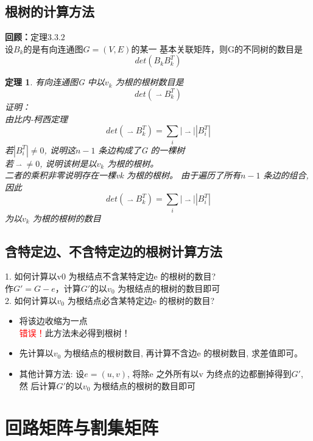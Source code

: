 \documentclass[11pt,a4paper,openany]{book}
\newcommand{\song}{\CJKfamily{song}}
\newtheorem{theorem}{\textbf{定理}}[section]
\begin{document}
\subsection{根树的计算方法}
\textbf{回顾：}定理$3.3.2$\\
设$B_k$的是有向连通图$G=(V,E)$的某一
基本关联矩阵，则G的不同树的数目是$$det(B_kB^T_k)$$
\begin{theorem}
有向连通图G 中以$v_k$ 为根的根树数目是$$det(\mathop{B_k}\limits^{\rightharpoonup}B_k^T)$$
{\song
证明：\\
由比内-柯西定理$$det(\mathop{B_k}\limits^{\rightharpoonup}B_k^T)=\sum_{i}|\mathop{B_i}\limits^{\rightharpoonup}||B_i^T|$$
若$|B_i^T|\neq 0$, 说明这$n-1$ 条边构成了G 的一棵树\\
若$ \mathop{B_i}\limits^{\rightharpoonup} \neq 0$, 说明该树是以$v_k$ 为根的根树。\\
二者的乘积非零说明存在一棵vk 为根的根树。
由于遍历了所有$n-1$ 条边的组合, 因此$$det(\mathop{B_k}\limits^{\rightharpoonup}B_k^T)=\sum_{i}|\mathop{B_i}\limits^{\rightharpoonup}||B_i^T|$$
为以$v_k$ 为根的根树的数目
}
\end{theorem}
\subsection{含特定边、不含特定边的根树计算方法}
1. 如何计算以v0 为根结点不含某特定边e 的根树的数目?\\
\indent 作$G'=G-e$，计算$G'$的以$v_0$ 为根结点的根树的数目即可\\
2. 如何计算以$v_0$ 为根结点必含某特定边e 的根树的数目?\\
\begin{itemize}
  \item 将该边收缩为一点\\
\textcolor{red}{错误！}此方法未必得到根树！
  \item 先计算以$v_0$ 为根结点的根树数目, 再计算不含边e 的根树数目,
求差值即可。
  \item 其他计算方法:
设$e=(u, v)$, 将除e 之外所有以v 为终点的边都删掉得到$G'$, 然
后计算$G'$的以$v_0$ 为根结点的根树的数目即可
\end{itemize}
\section{回路矩阵与割集矩阵}
\end{document}
